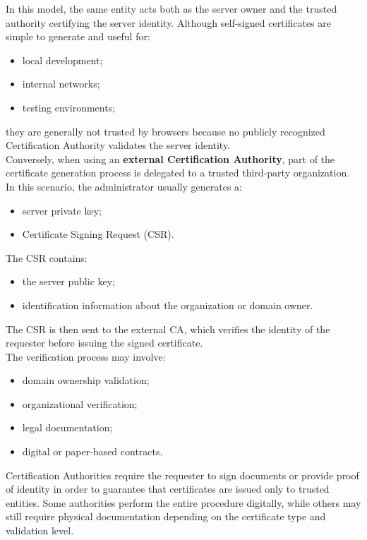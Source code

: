 \documentclass{scrbook}
\begin{document}
	In this model, the same entity acts both as the server owner and the trusted authority certifying the server identity. Although self-signed certificates are simple to generate and useful for:
	\begin{itemize}
		\item local development;
		\item internal networks;
		\item testing environments;
	\end{itemize}
	
	they are generally not trusted by browsers because no publicly recognized Certification Authority validates the server identity.\\
	
	Conversely, when using an \textbf{external Certification Authority}, part of the certificate generation process is delegated to a trusted third-party organization. In this scenario, the administrator usually generates a:
	\begin{itemize}
		\item server private key;
		\item Certificate Signing Request (CSR).
	\end{itemize}
	
	The CSR contains:
	\begin{itemize}
		\item the server public key;
		
		\item identification information about the organization or domain owner.
	\end{itemize}
	
	The CSR is then sent to the external CA, which verifies the identity of the requester before issuing the signed certificate.\\
	
	The verification process may involve:
	\begin{itemize}
		\item domain ownership validation;
		\item organizational verification;
		\item legal documentation;
		\item digital or paper-based contracts.
	\end{itemize}
	
	Certification Authorities require the requester to sign documents or provide proof of identity in order to guarantee that certificates are issued only to trusted entities. Some authorities perform the entire procedure digitally, while others may still require physical documentation depending on the certificate type and validation level.\\
	
\end{document}
